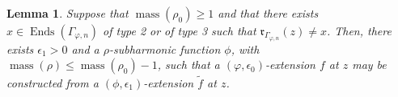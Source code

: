 \documentclass[10pt,reqno]{amsart}
\theoremstyle{plain}
\newtheorem{lemma}[theorem]{Lemma}
\theoremstyle{definition}
\newcommand{\frakm}{\mathfrak{m}}
\numberwithin{equation}{section}
\DeclareMathOperator{\Ends}{Ends}
\DeclareMathOperator{\mass}{mass}
\DeclareMathOperator{\rig}{rig}
\begin{document}
%

%
%
%


\begin{lemma}\label{lemma:three_variant}
Suppose that $\mass(\rho_0) \geq 1$ and that there exists $x \in \Ends(\Gamma_{\varphi,n})$ of type 2 or of type 3 such that $\mathfrak{r}_{\Gamma_{\varphi,n}}(z) \not= x$.
Then, there exists $\epsilon_1 > 0$ and a $\rho$-subharmonic function $\phi$, with $\mass(\rho) \leq \mass(\rho_0) - 1$, such that a $(\varphi,\epsilon_0)$-extension $f$ at $z$ may be constructed from a $(\phi,\epsilon_1)$-extension $\tilde{f}$ at $z$.
\end{lemma}
\end{document}
